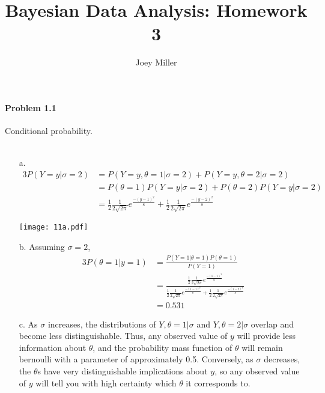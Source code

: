 \documentclass[10pt]{article}
\begin{document}
\title{Bayesian Data Analysis: Homework 3}
\author{Joey Miller}
\maketitle
\noindent

\paragraph{Problem 1.1} Conditional probability. \\ \\

\begin{enumerate}
\item[a.] \begin{alignat*}{3}
P(Y=y | \sigma = 2) &= P(Y=y, \theta=1 | \sigma = 2) + P(Y=y, \theta=2 | \sigma = 2) \\
&= P(\theta=1)P(Y=y | \sigma = 2)+P(\theta=2)P(Y=y | \sigma = 2) \\
&= \frac{1}{2}\frac{1}{2\sqrt{2\pi}}e^{\frac{-(y-1)^2}{8}} + \frac{1}{2}\frac{1}{2\sqrt{2\pi}}e^{\frac{-(y-2)^2}{8}}
\end{alignat*}
\begin{center}
\texttt{[image: 11a.pdf]}
\end{center}

\item[b.] Assuming $\sigma=2$,
\begin{alignat*}{3}
P(\theta=1 | y=1)&=\frac{P(Y=1|\theta=1)P(\theta=1)}{P(Y=1)} \\
&=\frac{\frac{1}{2}\frac{1}{2\sqrt{2\pi}}e^{\frac{-(1-1)^2}{8}}}{\frac{1}{2}\frac{1}{2\sqrt{2\pi}}e^{\frac{-(1-1)^2}{8}} + \frac{1}{2}\frac{1}{2\sqrt{2\pi}}e^{\frac{-(1-2)^2}{8}}} \\
&=0.531
\end{alignat*}

\item[c.] As $\sigma$ increases, the distributions of $Y,\theta=1 | \sigma$ and $Y,\theta=2 | \sigma$ overlap and become less distinguishable. Thus, any observed value of $y$ will provide less information about $\theta$, and the probability mass function of $\theta$ will remain bernoulli with a parameter of approximately 0.5. Conversely, as $\sigma$ decreases, the $\theta$s have very distinguishable implications about $y$, so any observed value of $y$ will tell you with high certainty which $\theta$ it corresponds to.

\end{enumerate}
\end{document}
